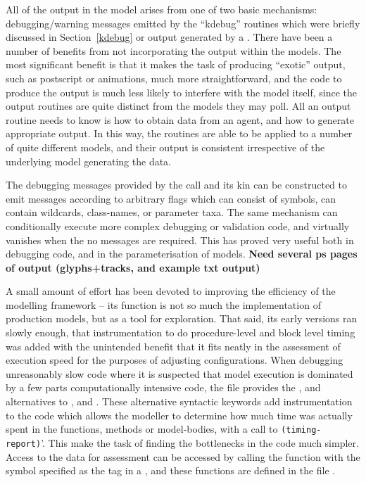 \vspace{3mm}
All of the output in the model arises from one of two basic
mechanisms: debugging/warning messages emitted by the ``kdebug''
routines which were briefly discussed in Section~\ref{kdebug} or
output generated by a \mlogger.  There have been a number of benefits
from not incorporating the output within the models.  The most
significant benefit is that it makes the task of producing ``exotic''
output, such as postscript or animations, much more straightforward,
and the code to produce the output is much less likely to interfere
with the model itself, since the output routines are quite distinct
from the models they may poll.  All an output routine needs to know is
how to obtain data from an agent, and how to generate appropriate
output. In this way, the  routines are able to be
applied to a number of quite different models, and their output is
consistent irrespective of the underlying model generating the data.

The debugging messages provided by the  call and its
kin can be constructed to emit messages according to arbitrary flags
which can consist of symbols, can contain wildcards, class-names, or
parameter taxa.  The same mechanism can conditionally execute more
complex debugging or validation code, and virtually vanishes when the
no messages are required.  This has proved very useful both in
debugging code, and in the parameterisation of models.
{\textbf{Need several ps pages of output (glyphs+tracks, and example txt output)}}

\vspace{3mm}
A small amount of effort has been devoted to improving the efficiency
of the modelling framework -- its function is not so much the
implementation of production models, but as a tool for exploration.
That said, its early versions ran slowly enough, that instrumentation
to do procedure-level and block level timing was added with the
unintended benefit that it fits neatly in the assessment of execution
speed for the purposes of adjusting configurations.  When debugging
unreasonably slow code where it is suspected that model execution is
dominated by a few parts computationally intensive code,  the
 file provides the ,
 and 
alternatives to ,  and
. These alternative syntactic keywords add
instrumentation to the code which allows the modeller to determine how
much time was actually spent in the functions, methods or
model-bodies, with a call to \texttt{(timing-report)}'. This make the
task of finding the bottlenecks in the code much simpler.  Access to
the data for assessment can be accessed by calling the
function  with the symbol specified as the tag in
a , and these functions are defined in the
file . 



